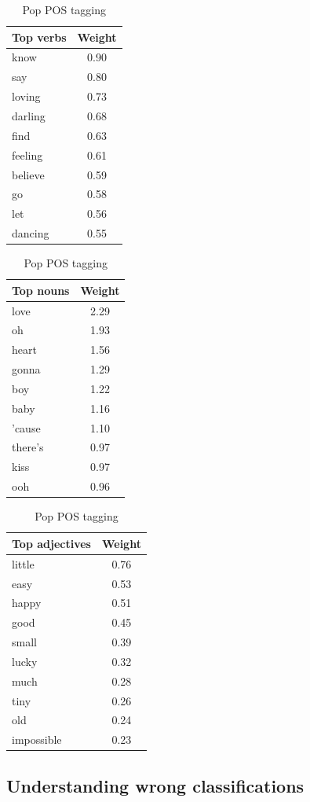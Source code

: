 \documentclass[a4paper,11pt]{article}
\begin{document}
\begin{table}[h!]
\centering
\begin{tabular}{|l|c|}
\hline
Top verbs & Weight \\
\hline
know & 0.90 \\
say & 0.80 \\
loving & 0.73 \\
darling & 0.68 \\
find & 0.63 \\
feeling & 0.61 \\
believe & 0.59 \\
go & 0.58 \\
let & 0.56 \\
dancing & 0.55 \\
\hline
\end{tabular}
\quad
\begin{tabular}{|l|c|}
\hline
Top nouns & Weight \\
\hline
love & 2.29 \\
oh & 1.93 \\
heart & 1.56 \\
gonna & 1.29 \\
boy & 1.22 \\
baby & 1.16 \\
'cause & 1.10 \\
there's & 0.97 \\
kiss & 0.97 \\
ooh & 0.96 \\
\hline
\end{tabular}
\quad
\begin{tabular}{|l|c|}
\hline
Top adjectives & Weight \\
\hline
little & 0.76 \\
easy & 0.53 \\
happy & 0.51 \\
good & 0.45 \\
small & 0.39 \\
lucky & 0.32 \\
much & 0.28 \\
tiny & 0.26 \\
old & 0.24 \\
impossible & 0.23 \\
\hline
\end{tabular}
\caption{Pop POS tagging}
\label{label-pop-pos}
\end{table}

\pagebreak
\subsection{Understanding wrong classifications}
\end{document}
